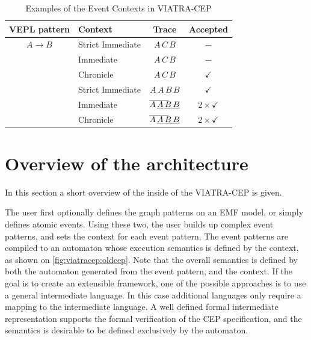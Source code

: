 \begin{table}
	\caption{Examples of the Event Contexts in VIATRA-CEP}		
	\label{tab:cep:contextexample}
	\centering
	\begin{tabular}{@{}clcc@{}}
		\toprule
		  VEPL pattern    & Context          &                             Trace                             &      Accepted       \\ \midrule
		$A \rightarrow B$ & Strict Immediate &                           $A\,C\,B$                           &         $-$         \\[1ex]
		                  & Immediate        &                           $A\,C\,B$                           &         $-$         \\[1ex]
		                  & Chronicle        &                     $\underline{A\,C\,B}$                     &    $\checkmark$     \\[4ex]
		                  & Strict Immediate &                   $A\,\underline{A\,B}\,B$                    &    $\checkmark$     \\[1ex]
		                  & Immediate        & $\mathrlap{\overline{\phantom{AAB}}} A\, \underline{A\,B\,B}$ & $2\times\checkmark$ \\[1ex]
		                  & Chronicle        & $\mathrlap{\overline{\phantom{AAB}}} A\, \underline{A\,B\,B}$ & $2\times\checkmark$ \\[1ex] \bottomrule
	\end{tabular}
\end{table}



\section{Overview of the architecture}
In this section a short overview of the inside of the VIATRA-CEP is given.

The user first optionally defines the graph patterns on an EMF model, or simply defines atomic events.
Using these two, the user builds up complex event patterns, and sets the context for each event pattern. The event patterns are compiled to an automaton
whose execution semantics is defined by the context, as shown on \cref{fig:viatracep:oldcep}. 
Note that the overall semantics is defined by both the automaton generated from the event pattern, and the context.
If the goal is to create an extensible framework, one of the possible approaches is to use a general intermediate language. In this case additional languages only require a mapping to the intermediate language.
A well defined formal intermediate representation supports the formal verification of the CEP specification, and the semantics is desirable to be defined exclusively by the automaton.



